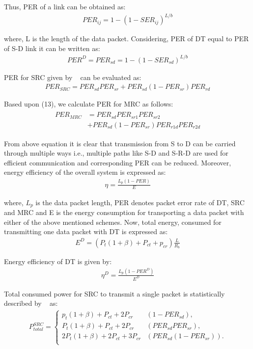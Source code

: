 \documentclass{sig-alternate}
\begin{document}
Thus, PER of a link can be obtained as:
 \begin{eqnarray}
PER_{ij}=1-(1-SER_{ij})^{L/b}
\end{eqnarray}

where, L is the length of the data packet. Considering, PER of DT equal to PER of S-D link it can be written as:
  \begin{eqnarray}
PER^D=PER_{sd}=1-(1-SER_{sd})^{L/b}
\end{eqnarray}

PER for SRC given by ~\cite{6} can be evaluated as:
  \small
  \begin{eqnarray}
PER_{SRC}=PER_{sd}PER_{sr}+PER_{sd}(1-PER_{sr})PER_{rd}
\end{eqnarray}
\normalsize

Based upon (13), we calculate PER for MRC as follows:
\small
 \begin{eqnarray}
 \begin{split}
PER_{MRC} &=PER_{sd}PER_{sr1}PER_{sr2} \\
&+PER_{sd}(1-PER_{sr})PER_{r1d}PER_{r2d}
\end{split}
\end{eqnarray}
\normalsize

From above equation it is clear that transmission from S to D can be carried through multiple ways i.e., multiple paths like S-D and S-R-D are used for efficient communication and corresponding PER can be reduced. Moreover, energy efficiency of the overall system is expressed as:
 \begin{eqnarray}
\eta= \frac {L_p(1-PER)}{E}
\end{eqnarray}

where, $L_p$ is the data packet length, PER denotes packet error rate of DT, SRC and MRC and E is the energy consumption for transporting a data packet with either of the above mentioned schemes.
Now, total energy, consumed for transmitting one data packet with DT is expressed as:
 \begin{eqnarray}
E^D=(P_t(1+\beta)+P_{ct}+p_{cr})\frac{L}{R_b}
\end{eqnarray}

Energy efficiency of DT is given by:
 \begin{eqnarray}
\eta^D= \frac {L_p(1-PER^D)}{E^D}
\end{eqnarray}

Total consumed power for SRC to transmit a single packet is statistically described by ~\cite{6} as:
\small
\begin{eqnarray}
 P^{SRC}_{total}=\left\{\begin{matrix}
 p_{t}(1+\beta)+P_{ct}+2P_{cr}&(1-PER_{sd}), \\
 P_t(1+\beta)+P_{ct}+2P_{cr}&(PER_{sd}PER_{sr}), \\
 2P_t(1+\beta)+2P_{ct}+3P_{cr}&(PER_{sd}(1-PER_{sr})). \\
\end{matrix}\right.
\end{eqnarray}
\normalsize
\end{document}
